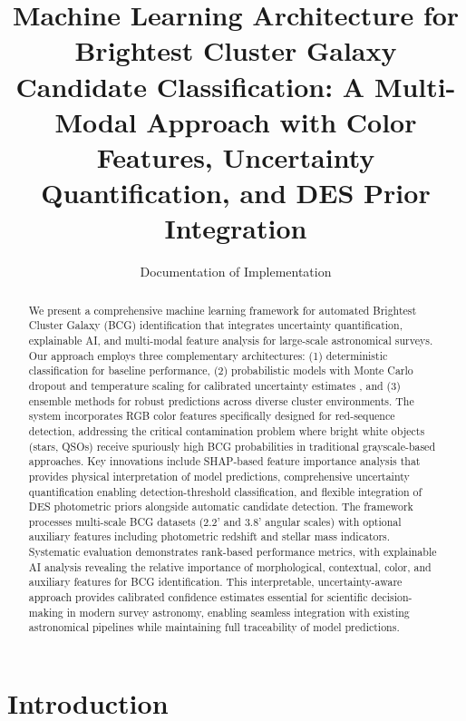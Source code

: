 \documentclass[twocolumn,10pt]{aastex631}
\begin{document}
\title{Machine Learning Architecture for Brightest Cluster Galaxy Candidate Classification: A Multi-Modal Approach with Color Features, Uncertainty Quantification, and DES Prior Integration}

\author{Documentation of Implementation}

\begin{abstract}
We present a comprehensive machine learning framework for automated Brightest Cluster Galaxy (BCG) identification that integrates uncertainty quantification, explainable AI, and multi-modal feature analysis for large-scale astronomical surveys. Our approach employs three complementary architectures: (1) deterministic classification for baseline performance, (2) probabilistic models with Monte Carlo dropout and temperature scaling for calibrated uncertainty estimates \citep{Laves2019WellCalibratedMU,Gal2016MCDropout}, and (3) ensemble methods for robust predictions across diverse cluster environments. The system incorporates RGB color features specifically designed for red-sequence detection, addressing the critical contamination problem where bright white objects (stars, QSOs) receive spuriously high BCG probabilities in traditional grayscale-based approaches. Key innovations include SHAP-based feature importance analysis that provides physical interpretation of model predictions, comprehensive uncertainty quantification enabling detection-threshold classification, and flexible integration of DES photometric priors \citep{Rykoff2016DES} alongside automatic candidate detection. The framework processes multi-scale BCG datasets (2.2' and 3.8' angular scales) with optional auxiliary features including photometric redshift and stellar mass indicators. Systematic evaluation demonstrates rank-based performance metrics, with explainable AI analysis revealing the relative importance of morphological, contextual, color, and auxiliary features for BCG identification. This interpretable, uncertainty-aware approach provides calibrated confidence estimates essential for scientific decision-making in modern survey astronomy, enabling seamless integration with existing astronomical pipelines while maintaining full traceability of model predictions.
\end{abstract}


\section{Introduction}
\end{document}
